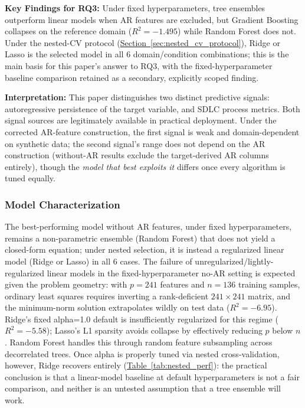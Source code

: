 \documentclass[technologies,article,submit,pdftex,moreauthors]{Definitions/mdpi}
\begin{document}
\textbf{Key Findings for RQ3:} Under fixed hyperparameters, tree ensembles outperform linear models when AR features are excluded, but Gradient Boosting collapses on the reference domain (\(R^2=-1.495\)) while Random Forest does not. Under the nested-CV protocol (\hyperref[sec:nested_cv_protocol]{Section~\ref*{sec:nested_cv_protocol}}), Ridge or Lasso is the selected model in all 6 domain/condition combinations; this is the main basis for this paper's answer to RQ3, with the fixed-hyperparameter baseline comparison retained as a secondary, explicitly scoped finding.

\textbf{Interpretation:} This paper distinguishes two distinct predictive signals: autoregressive persistence of the target variable, and SDLC process metrics. Both signal sources are legitimately available in practical deployment. Under the corrected AR-feature construction, the first signal is weak and domain-dependent on synthetic data; the second signal's range does not depend on the AR construction (without-AR results exclude the target-derived AR columns entirely), though the \emph{model that best exploits it} differs once every algorithm is tuned equally.

\subsubsection{Model Characterization}\label{sec:model_char}

The best-performing model without AR features, under fixed hyperparameters, remains a non-parametric ensemble (Random Forest) that does not yield a closed-form equation; under nested selection, it is instead a regularized linear model (Ridge or Lasso) in all 6 cases. The failure of unregularized/lightly-regularized linear models in the fixed-hyperparameter no-AR setting is expected given the problem geometry: with \(p=241\) features and \(n=136\) training samples, ordinary least squares requires inverting a rank-deficient \(241\times241\) matrix, and the minimum-norm solution extrapolates wildly on test data (\(R^2=-6.95\)). Ridge's fixed alpha=1.0 default is insufficiently regularized for this regime (\(R^2=-5.58\)); Lasso's L1 sparsity avoids collapse by effectively reducing \(p\) below \(n\). Random Forest handles this through random feature subsampling across decorrelated trees. Once alpha is properly tuned via nested cross-validation, however, Ridge recovers entirely (\hyperref[tab:nested_perf]{Table~\ref*{tab:nested_perf}}): the practical conclusion is that a linear-model baseline at default hyperparameters is not a fair comparison, and neither is an untested assumption that a tree ensemble will work.
\end{document}
